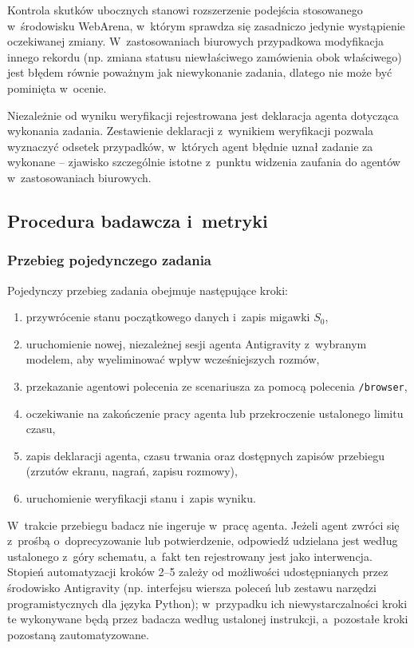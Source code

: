 Kontrola skutków ubocznych stanowi rozszerzenie podejścia stosowanego w~środowisku WebArena, w~którym sprawdza się zasadniczo jedynie wystąpienie oczekiwanej zmiany. W~zastosowaniach biurowych przypadkowa modyfikacja innego rekordu (np. zmiana statusu niewłaściwego zamówienia obok właściwego) jest błędem równie poważnym jak niewykonanie zadania, dlatego nie może być pominięta w~ocenie.

Niezależnie od wyniku weryfikacji rejestrowana jest deklaracja agenta dotycząca wykonania zadania. Zestawienie deklaracji z~wynikiem weryfikacji pozwala wyznaczyć odsetek przypadków, w~których agent błędnie uznał zadanie za wykonane -- zjawisko szczególnie istotne z~punktu widzenia zaufania do agentów w~zastosowaniach biurowych.

\subsection{Procedura badawcza i~metryki}
\label{sec:procedura}
\subsubsection{Przebieg pojedynczego zadania}
Pojedynczy przebieg zadania obejmuje następujące kroki:
\begin{enumerate}
    \item przywrócenie stanu początkowego danych i~zapis migawki $S_0$,
    \item uruchomienie nowej, niezależnej sesji agenta Antigravity z~wybranym modelem, aby wyeliminować wpływ wcześniejszych rozmów,
    \item przekazanie agentowi polecenia ze scenariusza za pomocą polecenia \texttt{/browser},
    \item oczekiwanie na zakończenie pracy agenta lub przekroczenie ustalonego limitu czasu,
    \item zapis deklaracji agenta, czasu trwania oraz dostępnych zapisów przebiegu (zrzutów ekranu, nagrań, zapisu rozmowy),
    \item uruchomienie weryfikacji stanu i~zapis wyniku.
\end{enumerate}
W~trakcie przebiegu badacz nie ingeruje w~pracę agenta. Jeżeli agent zwróci się z~prośbą o~doprecyzowanie lub potwierdzenie, odpowiedź udzielana jest według ustalonego z~góry schematu, a~fakt ten rejestrowany jest jako interwencja. Stopień automatyzacji kroków 2--5 zależy od możliwości udostępnianych przez środowisko Antigravity (np. interfejsu wiersza poleceń lub zestawu narzędzi programistycznych dla języka Python); w~przypadku ich niewystarczalności kroki te wykonywane będą przez badacza według ustalonej instrukcji, a~pozostałe kroki pozostaną zautomatyzowane.

